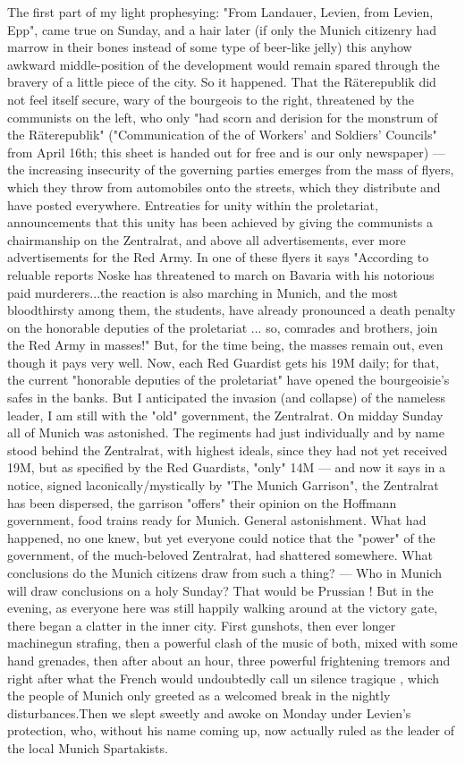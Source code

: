 The first part of my light prophesying: "From Landauer, Levien, from Levien, Epp", came true on Sunday, and a hair later (if only the Munich citizenry had marrow in their bones instead of some type of beer-like jelly) this anyhow awkward middle-position of the development would remain spared through the bravery of a little piece of the city. So it happened. That the Räterepublik did not feel itself secure, wary of the bourgeois to the right, threatened by the communists on the left, who only "had scorn and derision for the monstrum of the Räterepublik" ("Communication of the  of Workers' and Soldiers' Councils" from April 16th; this sheet is handed out for free and is our only newspaper) — the increasing insecurity of the governing parties emerges from the mass of flyers, which they throw from automobiles onto the streets, which they distribute and have posted everywhere. Entreaties for unity within the proletariat, announcements that this unity has been achieved by giving the communists a chairmanship on the Zentralrat, and above all advertisements, ever more advertisements for the Red Army. In one of these flyers it says "According to reluable reports Noske has threatened to march on Bavaria with his notorious paid murderers...the reaction is also marching in Munich, and the most bloodthirsty among them, the students, have already pronounced a death penalty on the honorable deputies of the proletariat ... so, comrades and brothers, join the Red Army in masses!" But, for the time being, the masses remain out, even though it pays very well. Now, each Red Guardist gets his 19M daily; for that, the current "honorable deputies of the proletariat" have opened the bourgeoisie's safes in the banks. But I anticipated the invasion (and collapse) of the nameless leader, I am still with the "old" government, the Zentralrat. On midday Sunday all of Munich was astonished. The regiments had just individually and by name stood behind the Zentralrat, with highest ideals, since they had not yet received 19M, but as specified by the Red Guardists, "only" 14M — and now it says in a notice, signed laconically/mystically by "The Munich Garrison", the Zentralrat has been dispersed, the garrison "offers" their opinion on the Hoffmann government, food trains ready for Munich. General astonishment. What had happened, no one knew, but yet everyone could notice that the "power" of the government, of the much-beloved Zentralrat, had shattered somewhere. What conclusions do the Munich citizens draw from such a thing? — Who in Munich will draw conclusions on a holy Sunday? That would be Prussian ! But in the evening, as everyone here was still happily walking around at the victory gate, there began a clatter in the inner city. First gunshots, then ever longer machinegun strafing, then a powerful clash of the music of both, mixed with some hand grenades, then after about an hour, three powerful frightening tremors and right after what the French would undoubtedly call un silence tragique , which the people of Munich only greeted as a welcomed break in the nightly disturbances.Then we slept sweetly and awoke on Monday under Levien's protection, who, without his name coming up, now actually ruled as the leader of the local Munich Spartakists. 